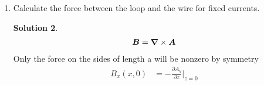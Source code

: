 \documentclass[letter,12pt]{article}
\theoremstyle{definition}
\newtheorem*{sol}{Solution}
\begin{document}
\begin{enumerate}
\begin{enumerate}
\begin{sol}
\begin{figure}[H]
\begin{tikzpicture}[x=0.25cm, y=0.25cm, z=0.15cm, >=stealth]
                    \end{tikzpicture}
                  \end{figure}
                    So $\bs{A}_2$ is given by
                    \begin{align*}
                        \bs{A}_2 = - \frac{I_2 \hat{\bs{y}}}{4 \pi}
                        \ln
                        \left[
                            {\left(
                                x - d \cos \alpha
                            \right)}^2
                            {\left(
                                x - d \sin \alpha
                            \right)}^2
                        \right]
                    \end{align*}
                    And only the sides of length $a$ will contribute:
                    \begin{align*}
                        \Rightarrow
                        W_{12} &= I_1 \oint d\bs{l}_1 \cdot \bs{A}_2
                        \\
                        &=
                        \frac{\mu_0 I_1 I_2 a}{4 \pi}
                        \ln
                        \left[
                            \frac
                            {{(-\frac{b}{2} - d \cos \alpha)}^2 - {(d \sin \alpha)}^2}
                            {{(\frac{b}{2} - d \cos \alpha)}^2 + {(d \sin \alpha)}^2}
                        \right]
                        \\
                        &=
                        \frac{\mu_0 I_1 I_2 a} {4 \pi}
                        \ln
                        \left[
                            \frac
                            {4d^2 + b^2 + 4db \cos \alpha}
                            {4d^2 + b^2 - 4db \cos \alpha}
                        \right]
                    \end{align*}
                \end{sol}
            \item
                Calculate the force between the loop and the wire for
                fixed currents.
                \begin{sol}
                    \begin{align*}
                        \bs{B} = \bs{\nabla} \times \bs{A}
                    \end{align*}
                    Only the force on the sides of length a will be nonzero by symmetry
                    \begin{align*}
                        B_x(x, 0) &=  - \frac{\partial A_y}{\partial z} \biggr \vert_{z=0}

\end{align*}
\end{sol}
\end{enumerate}
\end{enumerate}
\end{document}
